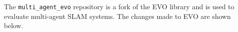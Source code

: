 The \texttt{multi\_agent\_evo} repository is a fork of the EVO library and is used to evaluate multi-agent SLAM systems. The changes made to EVO are shown below.

\begin{minipage}{\linewidth}
\end{minipage}

